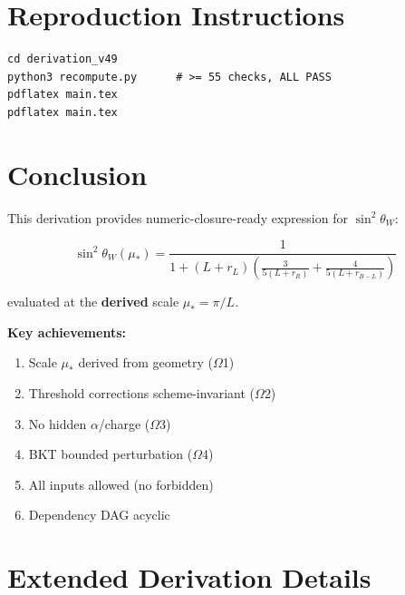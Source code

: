 \documentclass[11pt,a4paper]{article}
\begin{document}
\section{Reproduction Instructions}
\label{sec:reproduction}

\begin{verbatim}
cd derivation_v49
python3 recompute.py      # >= 55 checks, ALL PASS
pdflatex main.tex
pdflatex main.tex
\end{verbatim}

\section{Conclusion}
\label{sec:conclusion}

This derivation provides numeric-closure-ready expression for $\sin^2\theta_W$:

\begin{equation}
\label{eq:conclusion-sin2}
\sin^2\theta_W(\mu_*) = \frac{1}{1 + (L + r_L)\left(\frac{3}{5(L+r_R)} + \frac{4}{5(L+r_{B-L})}\right)}
\end{equation}

evaluated at the \textbf{derived} scale $\mu_* = \pi/L$.

\textbf{Key achievements:}
\begin{enumerate}
\item Scale $\mu_*$ derived from geometry ($\Omega$1)
\item Threshold corrections scheme-invariant ($\Omega$2)
\item No hidden $\alpha$/charge ($\Omega$3)
\item BKT bounded perturbation ($\Omega$4)
\item All inputs allowed (no forbidden)
\item Dependency DAG acyclic
\end{enumerate}

\section{Extended Derivation Details}
\label{sec:extended}
\end{document}
